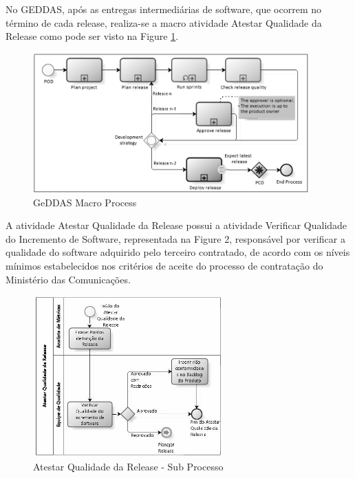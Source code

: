 No GEDDAS, após as entregas intermediárias de software, que ocorrem no término de
cada release, realiza-se a macro atividade Atestar Qualidade da Release como pode
ser visto na Figure \ref{fig:geddas}.

\begin{figure}[h]
  \centering
  \includegraphics[width=400px, scale=1]{figuras/geddas}
  \caption{GeDDAS Macro Process}
  \label{fig:geddas}
\end{figure}

A atividade Atestar Qualidade da Release possui a atividade Verificar Qualidade
do Incremento de Software,  representada na Figure 2, responsável por verificar a
qualidade do software adquirido pelo terceiro contratado, de acordo com os níveis
mínimos estabelecidos nos critérios de aceite do processo de contratação do
Ministério das Comunicações.

\begin{figure}[h]
  \centering
  \includegraphics[width=275px, scale=1]{figuras/atestarqualidade}
  \caption{Atestar Qualidade da Release - Sub Processo}
  \label{fig:atestarqualidade}
\end{figure}
